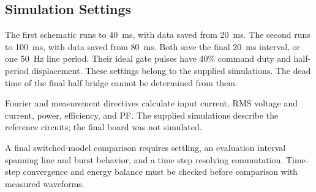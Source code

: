 \subsection{Simulation Settings}
\label{sec:sim-setup}

The first schematic runs to \SI{40}{\milli\second}, with data saved from \SI{20}{\milli\second}. The second runs to \SI{100}{\milli\second}, with data saved from \SI{80}{\milli\second}. Both save the final \SI{20}{\milli\second} interval, or one \SI{50}{\hertz} line period. Their ideal gate pulses have 40\% command duty and half-period displacement. These settings belong to the supplied simulations. The dead time of the final half bridge cannot be determined from them.

Fourier and measurement directives calculate input current, RMS voltage and current, power, efficiency, and PF. The supplied simulations describe the reference circuits; the final board was not simulated.

A final switched-model comparison requires settling, an evaluation interval spanning line and burst behavior, and a time step resolving commutation. Time-step convergence and energy balance must be checked before comparison with measured waveforms.
